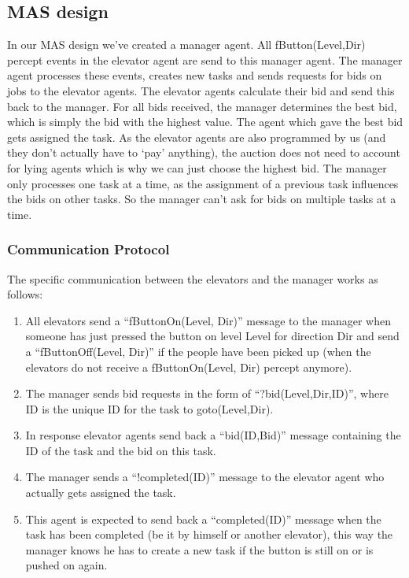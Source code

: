 \documentclass[a4paper,11pt]{article}
\begin{document}
\subsection{MAS design}
In our MAS design we've created a manager agent. All fButton(Level,Dir) percept events in the elevator agent are send to this manager agent. The manager agent processes these events, creates new tasks and sends requests for bids on jobs to the elevator agents. The elevator agents calculate their bid and send this back to the manager. For all bids received, the manager determines the best bid, which is simply the bid with the highest value. The agent which gave the best bid gets assigned the task. As the elevator agents are also programmed by us (and they don't actually have to `pay' anything), the auction does not need to account for lying agents which is why we can just choose the highest bid. The manager only processes one task at a time, as the assignment of a previous task influences the bids on other tasks. So the manager can't ask for bids on multiple tasks at a time. 

\subsubsection{Communication Protocol}
The specific communication between the elevators and the manager works as follows:
\begin{enumerate}
	\item All elevators send a ``fButtonOn(Level, Dir)'' message to the manager when someone has just pressed the button on level Level for direction Dir and send a ``fButtonOff(Level, Dir)'' if the people have been picked up (when the elevators do not receive a fButtonOn(Level, Dir) percept anymore).
	\item The manager sends bid requests in the form of ``?bid(Level,Dir,ID)'', where ID is the unique ID for the task to goto(Level,Dir).
	\item In response elevator agents send back a ``bid(ID,Bid)'' message containing the ID of the task and the bid on this task.
	\item The manager sends a ``!completed(ID)'' message to the elevator agent who actually gets assigned the task.
	\item This agent is expected to send back a ``completed(ID)'' message when the task has been completed (be it by himself or another elevator), this way the manager knows he has to create a new task if the button is still on or is pushed on again. 
\end{enumerate}
\end{document}
